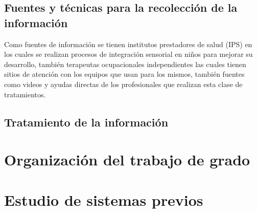 	\subsection{Fuentes y técnicas para la recolección de la información}
		Como fuentes de información se tienen institutos prestadores de salud (IPS) en los cuales se realizan procesos de integración sensorial en niños para mejorar su desarrollo, también terapeutas ocupacionales independientes las cuales tienen sitios de atención con los equipos que usan para los mismos, también fuentes como videos y ayudas directas de los profesionales que realizan esta clase de tratamientos.
	\subsection{Tratamiento de la información}
\section{Organización del trabajo de grado}
\section{Estudio de sistemas previos}
